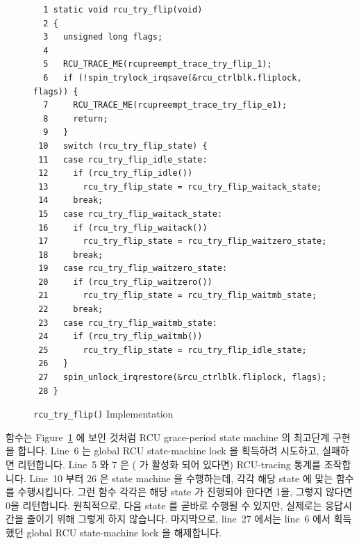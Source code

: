 \begin{figure}[tbp]
{ \scriptsize
\begin{verbatim}
  1 static void rcu_try_flip(void)
  2 {
  3   unsigned long flags;
  4
  5   RCU_TRACE_ME(rcupreempt_trace_try_flip_1);
  6   if (!spin_trylock_irqsave(&rcu_ctrlblk.fliplock, flags)) {
  7     RCU_TRACE_ME(rcupreempt_trace_try_flip_e1);
  8     return;
  9   }
 10   switch (rcu_try_flip_state) {
 11   case rcu_try_flip_idle_state:
 12     if (rcu_try_flip_idle())
 13       rcu_try_flip_state = rcu_try_flip_waitack_state;
 14     break;
 15   case rcu_try_flip_waitack_state:
 16     if (rcu_try_flip_waitack())
 17       rcu_try_flip_state = rcu_try_flip_waitzero_state;
 18     break;
 19   case rcu_try_flip_waitzero_state:
 20     if (rcu_try_flip_waitzero())
 21       rcu_try_flip_state = rcu_try_flip_waitmb_state;
 22     break;
 23   case rcu_try_flip_waitmb_state:
 24     if (rcu_try_flip_waitmb())
 25       rcu_try_flip_state = rcu_try_flip_idle_state;
 26   }
 27   spin_unlock_irqrestore(&rcu_ctrlblk.fliplock, flags);
 28 }
\end{verbatim}
}
\caption{{\tt rcu\_try\_flip()} Implementation}
\label{fig:app:rcuimpl:rcu_try_flip() Implementation}
\end{figure}

 함수는
Figure~\ref{fig:app:rcuimpl:rcu_try_flip() Implementation}
에 보인 것처럼 RCU grace-period state machine 의 최고단계 구현을 합니다.
Line~6 는 global RCU state-machine lock 을 획득하려 시도하고, 실패하면
리턴합니다.
Line~5 와 7 은 ( 가 활성화 되어 있다면) RCU-tracing 통계를
조작합니다.
Line~10 부터 26 은 state machine 을 수행하는데, 각각 해당 state 에 맞는 함수를
수행시킵니다.
그런 함수 각각은 해당 state 가 진행되야 한다면 1을, 그렇지 않다면 0을
리턴합니다.
원칙적으로, 다음 state 를 곧바로 수행될 수 있지만, 실제로는 응답시간을 줄이기
위해 그렇게 하지 않습니다.
마지막으로, line~27 에서는 line~6 에서 획득했던 global RCU state-machine lock
을 해제합니다.

